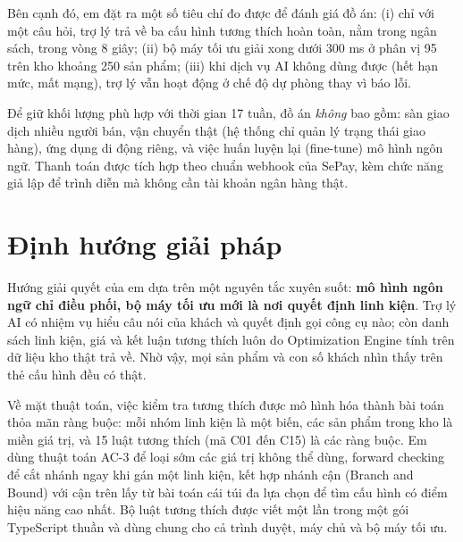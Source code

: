 Bên cạnh đó, em đặt ra một số tiêu chí đo được để đánh giá đồ án: (i) chỉ với một câu hỏi, trợ lý trả về ba cấu hình tương thích hoàn toàn, nằm trong ngân sách, trong vòng 8 giây; (ii) bộ máy tối ưu giải xong dưới 300 ms ở phân vị 95 trên kho khoảng 250 sản phẩm; (iii) khi dịch vụ AI không dùng được (hết hạn mức, mất mạng), trợ lý vẫn hoạt động ở chế độ dự phòng thay vì báo lỗi.

Để giữ khối lượng phù hợp với thời gian 17 tuần, đồ án \emph{không} bao gồm: sàn giao dịch nhiều người bán, vận chuyển thật (hệ thống chỉ quản lý trạng thái giao hàng), ứng dụng di động riêng, và việc huấn luyện lại (fine-tune) mô hình ngôn ngữ. Thanh toán được tích hợp theo chuẩn webhook của SePay, kèm chức năng giả lập để trình diễn mà không cần tài khoản ngân hàng thật.

\section{Định hướng giải pháp}

Hướng giải quyết của em dựa trên một nguyên tắc xuyên suốt: \textbf{mô hình ngôn ngữ chỉ điều phối, bộ máy tối ưu mới là nơi quyết định linh kiện}. Trợ lý AI có nhiệm vụ hiểu câu nói của khách và quyết định gọi công cụ nào; còn danh sách linh kiện, giá và kết luận tương thích luôn do Optimization Engine tính trên dữ liệu kho thật trả về. Nhờ vậy, mọi sản phẩm và con số khách nhìn thấy trên thẻ cấu hình đều có thật.

Về mặt thuật toán, việc kiểm tra tương thích được mô hình hóa thành bài toán thỏa mãn ràng buộc: mỗi nhóm linh kiện là một biến, các sản phẩm trong kho là miền giá trị, và 15 luật tương thích (mã C01 đến C15) là các ràng buộc. Em dùng thuật toán AC-3 để loại sớm các giá trị không thể dùng, forward checking để cắt nhánh ngay khi gán một linh kiện, kết hợp nhánh cận (Branch and Bound) với cận trên lấy từ bài toán cái túi đa lựa chọn để tìm cấu hình có điểm hiệu năng cao nhất. Bộ luật tương thích được viết một lần trong một gói TypeScript thuần và dùng chung cho cả trình duyệt, máy chủ và bộ máy tối ưu.


